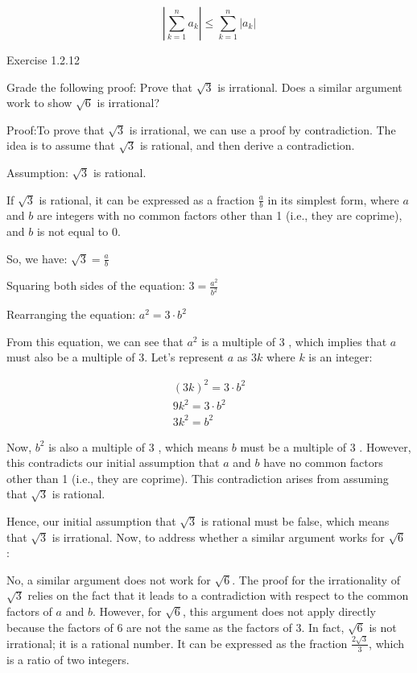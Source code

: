 \documentclass{report}
\begin{document}
\bigskip
{}



$$
\left|\sum_{k=1}^{n} a_{k}\right| \leq \sum_{k=1}^{n}\left|a_{k}\right|
$$

\qs{}
{Exercise 1.2.12}

\qs{}
{Grade the following proof: Prove that $\sqrt{3}$ is irrational. Does a similar argument work to show $\sqrt{6}$ is irrational?}

Proof:To prove that $\sqrt{3}$ is irrational, we can use a proof by contradiction. The idea is to assume that $\sqrt{3}$ is rational, and then derive a contradiction.

Assumption: $\sqrt{3}$ is rational.

If $\sqrt{3}$ is rational, it can be expressed as a fraction $\frac{a}{b}$ in its simplest form, where $a$ and $b$ are integers with no common factors other than 1 (i.e., they are coprime), and $b$ is not equal to 0.

So, we have: $\sqrt{3}=\frac{a}{b}$

Squaring both sides of the equation: $3=\frac{a^{2}}{b^{2}}$

Rearranging the equation: $a^{2}=3 \cdot b^{2}$

From this equation, we can see that $a^{2}$ is a multiple of 3 , which implies that $a$ must also be a multiple of 3. Let's represent $a$ as $3 k$ where $k$ is an integer:

$$
\begin{gathered}
(3 k)^{2}=3 \cdot b^{2} \\
9 k^{2}=3 \cdot b^{2} \\
3 k^{2}=b^{2}
\end{gathered}
$$

Now, $b^{2}$ is also a multiple of 3 , which means $b$ must be a multiple of 3 . However, this contradicts our initial assumption that $a$ and $b$ have no common factors other than 1 (i.e., they are coprime). This contradiction arises from assuming that $\sqrt{3}$ is rational.

Hence, our initial assumption that $\sqrt{3}$ is rational must be false, which means that $\sqrt{3}$ is irrational. Now, to address whether a similar argument works for $\sqrt{6}$ :

No, a similar argument does not work for $\sqrt{6}$. The proof for the irrationality of $\sqrt{3}$ relies on the fact that it leads to a contradiction with respect to the common factors of $a$ and $b$. However, for $\sqrt{6}$, this argument does not apply directly because the factors of 6 are not the same as the factors of 3. In fact, $\sqrt{6}$ is not irrational; it is a rational number. It can be expressed as the fraction $\frac{2 \sqrt{3}}{3}$, which is a ratio of two integers.
\end{document}
